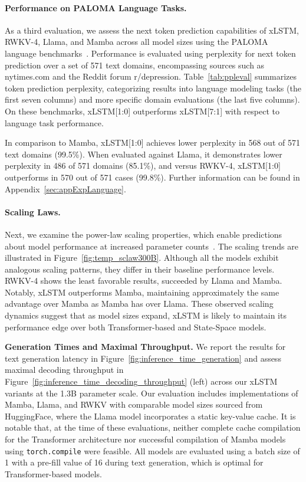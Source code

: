 \paragraph{Performance on PALOMA Language Tasks.} As a third evaluation, we assess the next token prediction capabilities of xLSTM, RWKV-4, Llama, and Mamba across all model sizes using the PALOMA language benchmarks~\citep{Magnusson:23arxivshort}. Performance is evaluated using perplexity for next token prediction over a set of 571 text domains, encompassing sources such as nytimes.com and the Reddit forum r/depression. Table~\ref{tab:ppleval} summarizes token prediction perplexity, categorizing results into language modeling tasks (the first seven columns) and more specific domain evaluations (the last five columns). On these benchmarks, xLSTM[1:0] outperforms xLSTM[7:1] with respect to language task performance.

In comparison to Mamba, xLSTM[1:0] achieves lower perplexity in 568 out of 571 text domains (99.5\%). When evaluated against Llama, it demonstrates lower perplexity in 486 of 571 domains (85.1\%), and versus RWKV-4, xLSTM[1:0] outperforms in 570 out of 571 cases (99.8\%). Further information can be found in Appendix~\ref{sec:appExpLanguage}.

\paragraph{Scaling Laws.} Next, we examine the power-law scaling properties, which enable predictions about model performance at increased parameter counts~\citep{Kaplan:20,Brown:20short}. The scaling trends are illustrated in Figure~\ref{fig:temp_sclaw300B}. Although all the models exhibit analogous scaling patterns, they differ in their baseline performance levels. RWKV-4 shows the least favorable results, succeeded by Llama and Mamba. Notably, xLSTM outperforms Mamba, maintaining approximately the same advantage over Mamba as Mamba has over Llama. These observed scaling dynamics suggest that as model sizes expand, xLSTM is likely to maintain its performance edge over both Transformer-based and State-Space models.

\textbf{Generation Times and Maximal Throughput.} We report the results for text generation latency in Figure~\ref{fig:inference_time_generation} and assess maximal decoding throughput in Figure~\ref{fig:inference_time_decoding_throughput} (left) across our xLSTM variants at the 1.3B parameter scale. Our evaluation includes implementations of Mamba, Llama, and RWKV with comparable model sizes sourced from HuggingFace, where the Llama model incorporates a static key-value cache. It is notable that, at the time of these evaluations, neither complete cache compilation for the Transformer architecture nor successful compilation of Mamba models using \texttt{torch.compile} were feasible. All models are evaluated using a batch size of 1 with a pre-fill value of 16 during text generation, which is optimal for Transformer-based models.


